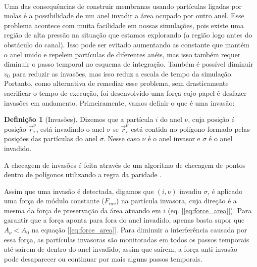 \documentclass{article}
\theoremstyle{definition}
\newtheorem{definition}{Definição}[section]
\def \quantity#1#2#3{\vec{#1}_{#2}^{#3}}
\begin{document}
\paragraph{}
Uma das consequências de construir membranas usando partículas ligadas por molas é a possibilidade de um anel invadir a área ocupado por outro anel. Esse problema acontece com muita facilidade em nossas simulações, pois existe uma região de alta pressão na situação que estamos explorando (a região logo antes do obstáculo do canal). Isso pode ser evitado aumentando as constante que mantém o anel unido e repelem partículas de diferentes anéis, mas isso também requer diminuir o passo temporal no esquema de integração. Também é possível diminuir $v_0$ para reduzir as invasões, mas isso reduz a escala de tempo da simulação. Portanto, como alternativa de remediar esse problema, sem drasticamente sacrificar o tempo de execução, foi desenvolvido uma força cujo papel é desfazer invasões em andamento. Primeiramente, vamos definir o que é uma invasão:
\begin{definition}[Invasões]
\label{def:invasion}
Dizemos que a partícula $i$ do anel $\nu$, cuja posição é posição $\quantity{r}{i}{\nu}$, está invadindo o anel $\sigma$ se $\quantity{r}{i}{\nu}$ está contida no polígono formado pelas posições das partículas do anel $\sigma$. Nesse caso $\nu$ é o anel invasor e $\sigma$ é o anel invadido.
\end{definition}
A checagem de invasões é feita através de um algoritmo de checagem de pontos dentro de polígonos utilizando a regra da paridade \cite{hormann_point_2001}. 

Assim que uma invasão é detectada, digamos que $(i, \nu)$ invadiu $\sigma$, é aplicado uma força de módulo constante ($F_{inv}$) na partícula invasora, cuja direção é a mesma da força de preservação da área atuando em $i$ (eq. [\ref{eq:force_area}]). Para garantir que a força aponta para fora do anel invadido, apenas basta supor que $A_\nu < A_0$ na equação [\ref{eq:force_area}]. Para diminuir a interferência  causada por essa força, as partículas invasoras são monitoradas em todos os passos temporais até saírem de dentro do anel invadido, assim que saírem, a força anti-invasão pode desaparecer ou continuar por mais alguns passos temporais. 
\end{document}
